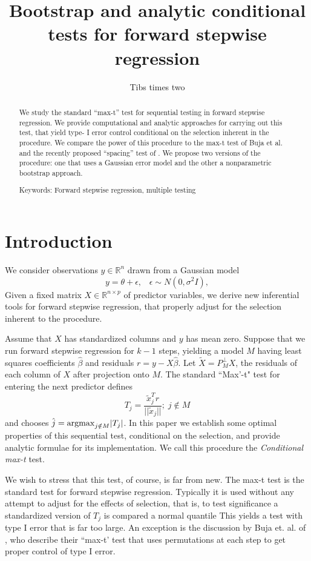 \documentclass{article}
\title{	Bootstrap and analytic conditional tests for  forward stepwise regression}
\author{Tibs times two}
\def\real{\mathbb{R}}
\begin{document}
\maketitle

\begin{abstract}
We study the standard ``max-t'' test for sequential testing in forward stepwise regression.
We provide computational and analytic approaches for carrying out this test,  that yield type- I error
control  conditional on the selection inherent in the procedure.
We compare the power of this procedure to the max-t test of Buja et al. and the recently proposed ``spacing'' test of \citet{TLTT2014}.
We propose two versions of the procedure: one that uses a  Gaussian error model and the other a  nonparametric bootstrap approach.

Keywords: Forward stepwise regression, multiple testing

\end{abstract}


\section{Introduction}
\label{sec:intro}
We consider observations $y \in \real^n$ drawn from a Gaussian model  
\begin{equation}
y = \theta + \epsilon, \;\;\; \epsilon \sim N(0,\sigma^2 I),
\label{eq:mod}
\end{equation}
Given a fixed matrix $X \in \real^{n\times p}$ of predictor variables,
we  derive new inferential tools for forward stepwise regression, that properly adjust
for the selection inherent to the procedure.


Assume that $X$ has standardized columns and $y$ has mean zero.
Suppose that we run forward stepwise regression for $k-1$ steps, yielding a model $M$ having  least squares coefficients
$\hat\beta$ and residuals $r=y-X\hat\beta$. Let $\tilde X=P_M^\perp X$, the residuals of each column of $X$ after projection onto $M$.
The  standard ``Max'-t" test for entering the next predictor defines
$$ T_j=\frac{\tilde x_j^Tr}{||\tilde x_j||};\; j\notin M$$
and chooses $\hat j ={\rm argmax}_{j\notin M}  |T_j|$.
In this paper we establish some  optimal properties of this sequential test, conditional on the selection, and provide analytic formulae for its implementation.
We call this procedure the {\em Conditional max-t} test.

We wish to stress that this test, of  course, is far from new. The max-t test is the standard test for forward stepwise regression.
Typically it is used without any attempt to adjust for the  effects of selection, that is, to test significance a standardized version of $T_j$ is compared a normal quantile
This yields a test with type I error that is far too large.  An exception is the discussion by Buja et. al. of \citet{LTTT2014}, who
describe their ``max-t'  test that uses permutations at each step to get proper control of type I error.
\end{document}
